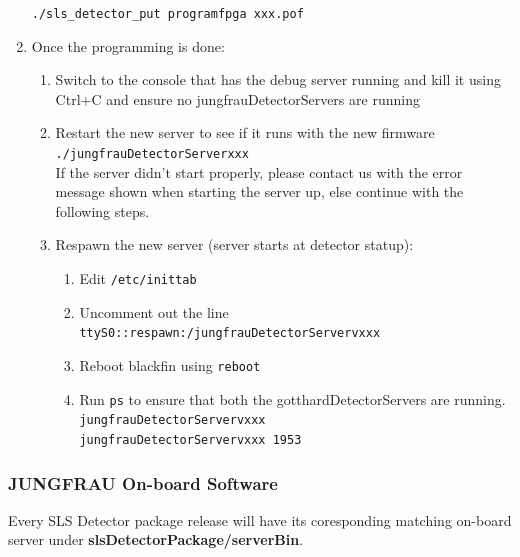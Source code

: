 \documentclass{article}
\begin{document}
\begin{enumerate}
\verb=./sls_detector_put programfpga xxx.pof= 
  \item Once the programming is done:
  \begin{enumerate}
    \item Switch to the console that has the debug server running and kill it
using Ctrl+C and ensure no jungfrauDetectorServers are
running
    \item Restart the new server to see if it runs with the new firmware \\
\verb=./jungfrauDetectorServerxxx= \\
If the server didn't start properly, please contact us with the error message
shown when starting the server up, else continue with the following steps.
    \item Respawn the new server (server starts at detector statup): 
    \begin{enumerate}
      \item Edit \verb=/etc/inittab= 
      \item Uncomment out the line
\verb=ttyS0::respawn:/jungfrauDetectorServervxxx= 
      \item Reboot blackfin using \verb=reboot=
      \item Run \verb=ps= to ensure that both the gotthardDetectorServers are
running.\\
\verb=jungfrauDetectorServervxxx= \\
\verb=jungfrauDetectorServervxxx 1953=
    \end{enumerate}
  \end{enumerate}

\end{enumerate}



\subsubsection{JUNGFRAU On-board Software}
Every SLS Detector package release will have its coresponding matching on-board
server under \textbf{slsDetectorPackage/serverBin}.
\end{document}
